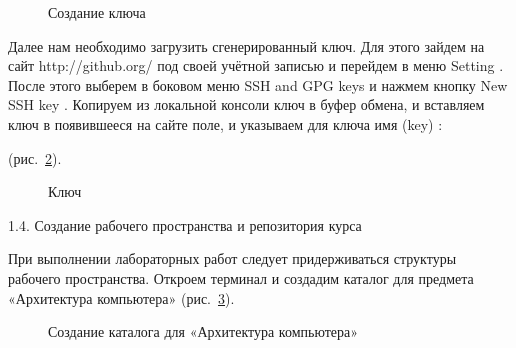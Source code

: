 \documentclass[
  english,
  russian,
  12pt,
  a4paper,
  DIV=11,
  numbers=noendperiod]{scrreprt}
\begin{document}
\begin{figure}


\caption{\label{fig-004}Создание ключа}

\end{figure}%

Далее нам необходимо загрузить сгенерированный ключ. Для этого зайдем на
сайт http://github.org/ под своей учётной записью и перейдем в меню
Setting . После этого выберем в боковом меню SSH and GPG keys и нажмем
кнопку New SSH key . Копируем из локальной консоли ключ в буфер обмена,
и вставляем ключ в появившееся на сайте поле, и указываем для ключа имя
(key) :

(рис.~\ref{fig-005}).

\begin{figure}


\caption{\label{fig-005}Ключ}

\end{figure}%

1.4. Создание рабочего пространства и репозитория курса

При выполнении лабораторных работ следует придерживаться структуры
рабочего пространства. Откроем терминал и создадим каталог для предмета
«Архитектура компьютера» (рис.~\ref{fig-006}).

\begin{figure}


\caption{\label{fig-006}Создание каталога для «Архитектура компьютера»}

\end{figure}%
\end{document}
